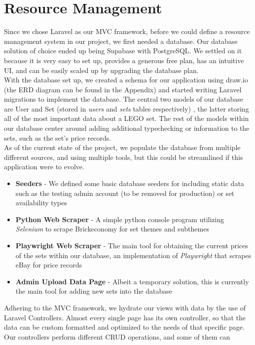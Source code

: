 \section{Resource Management}

Since we chose Laravel as our MVC framework, before we could define a resource management system in our project, we first needed a database.
Our database solution of choice ended up being Supabase with PostgreSQL. We settled on it because it is very easy to set up, provides a generous
free plan, has an intuitive UI, and can be easily scaled up by upgrading the database plan.\\
With the database set up, we created a schema for our application using draw.io (the ERD diagram can be found in the Appendix) and started writing Laravel 
migrations to implement the database. The central two models of our database are User and Set (stored in \textit{users} and \textit{sets} tables respectively)
, the latter storing all of the most important data about a LEGO set.
The rest of the models within our database center around adding additional typechecking or information to the sets, such as the set's price records.\\
As of the current state of the project, we populate the database from multiple different sources, and using multiple tools, but this could be streamlined 
if this application were to evolve.
\begin{itemize}
    \item \textbf{Seeders} - We defined some basic database seeders for including static data such as the testing admin account (to be removed for production) or set availability types
    \item \textbf{Python Web Scraper} - A simple python console program utilizing \textit{Selenium} to scrape Brickeconomy for set themes and subthemes
    \item \textbf{Playwright Web Scraper} - The main tool for obtaining the current prices of the sets within our database, an implementation of \textit{Playwright} that scrapes eBay for price records
    \item \textbf{Admin Upload Data Page} - Albeit a temporary solution, this is currently the main tool for adding new sets into the database 
\end{itemize}
Adhering to the MVC framework, we hydrate our views with data by the use of Laravel Controllers. Almost every single page has its own controller, so
that the data can be custom formatted and optimized to the needs of that specific page. Our controllers perform different CRUD operations, and some of them can
